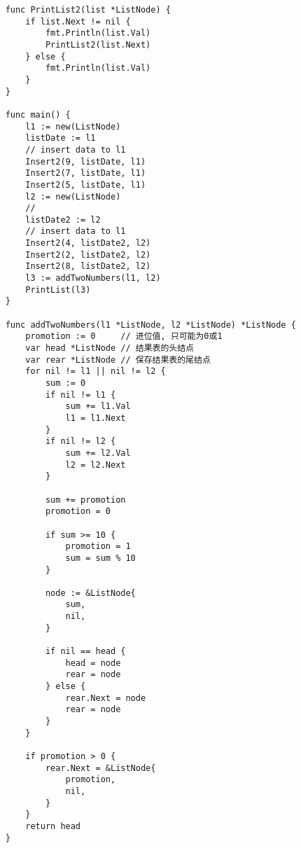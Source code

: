\documentclass[oneside,12pt,twiside,a4paper]{ctexbook}
\begin{document}
\begin{lstlisting}
    func PrintList2(list *ListNode) {
        if list.Next != nil {
            fmt.Println(list.Val)
            PrintList2(list.Next)
        } else {
            fmt.Println(list.Val)
        }
    }
    
    func main() {
        l1 := new(ListNode)
        listDate := l1
        // insert data to l1
        Insert2(9, listDate, l1)
        Insert2(7, listDate, l1)
        Insert2(5, listDate, l1)
        l2 := new(ListNode)
        //
        listDate2 := l2
        // insert data to l1
        Insert2(4, listDate2, l2)
        Insert2(2, listDate2, l2)
        Insert2(8, listDate2, l2)
        l3 := addTwoNumbers(l1, l2)
        PrintList(l3)
    }
    
    func addTwoNumbers(l1 *ListNode, l2 *ListNode) *ListNode {
        promotion := 0     // 进位值, 只可能为0或1
        var head *ListNode // 结果表的头结点
        var rear *ListNode // 保存结果表的尾结点
        for nil != l1 || nil != l2 {
            sum := 0
            if nil != l1 {
                sum += l1.Val
                l1 = l1.Next
            }
            if nil != l2 {
                sum += l2.Val
                l2 = l2.Next
            }
    
            sum += promotion
            promotion = 0
    
            if sum >= 10 {
                promotion = 1
                sum = sum % 10
            }
    
            node := &ListNode{
                sum,
                nil,
            }
    
            if nil == head {
                head = node
                rear = node
            } else {
                rear.Next = node
                rear = node
            }
        }
    
        if promotion > 0 {
            rear.Next = &ListNode{
                promotion,
                nil,
            }
        }
        return head
    }    
\end{lstlisting}
\end{document}
